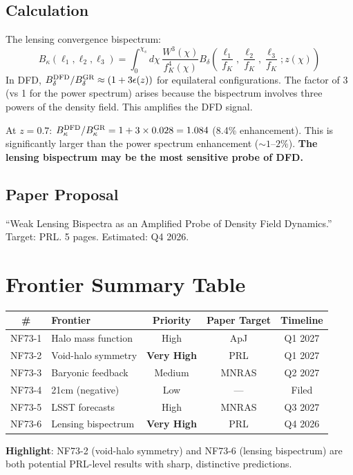 \documentclass[11pt,a4paper]{article}
\begin{document}
\subsection{Calculation}
The lensing convergence bispectrum:
\[
B_\kappa(\ell_1, \ell_2, \ell_3) = \int_0^{\chi_s} d\chi\,\frac{W^3(\chi)}{f_K^4(\chi)} B_{\delta}\left(\frac{\ell_1}{f_K}, \frac{\ell_2}{f_K}, \frac{\ell_3}{f_K}; z(\chi)\right)
\]
In DFD, $B_\delta^{\rm DFD}/B_\delta^{\rm GR} \approx (1 + 3\epsilon(z))$ for equilateral configurations. The factor of 3 (vs 1 for the power spectrum) arises because the bispectrum involves three powers of the density field. This amplifies the DFD signal.

At $z = 0.7$: $B_\kappa^{\rm DFD}/B_\kappa^{\rm GR} = 1 + 3 \times 0.028 = 1.084$ (8.4\% enhancement). This is significantly larger than the power spectrum enhancement ($\sim 1$--$2\%$). \textbf{The lensing bispectrum may be the most sensitive probe of DFD.}

\subsection{Paper Proposal}
``Weak Lensing Bispectra as an Amplified Probe of Density Field Dynamics.'' Target: PRL. 5 pages. Estimated: Q4 2026.

\section{Frontier Summary Table}

\begin{center}
\begin{tabular}{clccc}
\toprule
\textbf{\#} & \textbf{Frontier} & \textbf{Priority} & \textbf{Paper Target} & \textbf{Timeline} \\
\midrule
NF73-1 & Halo mass function & High & ApJ & Q1 2027 \\
NF73-2 & Void-halo symmetry & \textbf{Very High} & PRL & Q1 2027 \\
NF73-3 & Baryonic feedback & Medium & MNRAS & Q2 2027 \\
NF73-4 & 21cm (negative) & Low & --- & Filed \\
NF73-5 & LSST forecasts & High & MNRAS & Q3 2027 \\
NF73-6 & Lensing bispectrum & \textbf{Very High} & PRL & Q4 2026 \\
\bottomrule
\end{tabular}
\end{center}

\textbf{Highlight}: NF73-2 (void-halo symmetry) and NF73-6 (lensing bispectrum) are both potential PRL-level results with sharp, distinctive predictions.
\end{document}

